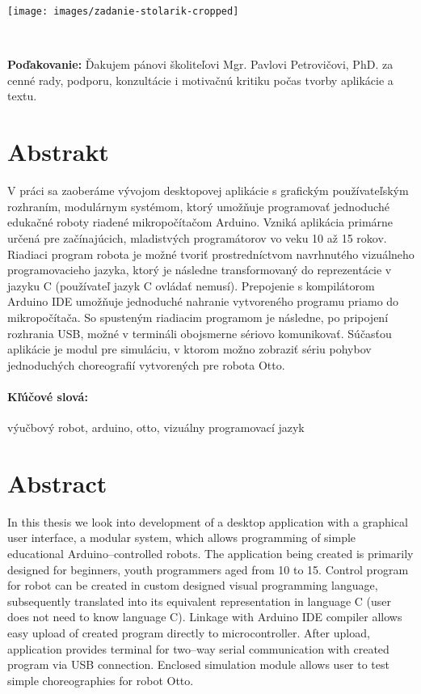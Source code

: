\documentclass[12pt, twoside]{book}
\begin{document}
\newpage 
\thispagestyle{empty}
\hspace{-2cm}\texttt{[image: images/zadanie-stolarik-cropped]}


\frontmatter

\setcounter{page}{3}
\newpage 
~

\vfill
{\bf Poďakovanie:} Ďakujem pánovi školiteľovi Mgr. Pavlovi Petrovičovi, PhD. za cenné rady, podporu, konzultácie i motivačnú kritiku počas tvorby aplikácie a textu.


\newpage 
\section*{Abstrakt}
V práci sa zaoberáme vývojom desktopovej aplikácie s grafickým používateľským rozhraním, modulárnym systémom, ktorý umožňuje programovať jednoduché edukačné roboty riadené mikropočítačom Arduino. Vzniká aplikácia primárne určená pre začínajúcich, mladistvých programátorov vo veku 10 až 15 rokov. Riadiaci program robota je možné tvoriť prostredníctvom navrhnutého vizuálneho programovacieho jazyka, ktorý je následne transformovaný do reprezentácie v jazyku C (používateľ jazyk C ovládať nemusí). Prepojenie s kompilátorom Arduino IDE umožňuje jednoduché nahranie vytvoreného programu priamo do mikropočítača. So spusteným riadiacim programom je následne, po pripojení rozhrania USB, možné v termináli obojsmerne sériovo komunikovať. Súčasťou aplikácie je modul pre simuláciu, v ktorom možno zobraziť sériu pohybov jednoduchých choreografií vytvorených pre robota Otto.

\paragraph*{Kľúčové slová:} výučbový robot, arduino, otto, vizuálny programovací jazyk


\newpage 
\section*{Abstract}

In this thesis we look into development of a desktop application with a graphical user interface, a modular system, which allows programming of simple educational Arduino--controlled robots. The application being created is primarily designed for beginners, youth programmers aged from 10 to 15. Control program for robot can be created in custom designed visual programming language, subsequently translated into its equivalent representation in language C (user does not need to know language C). Linkage with Arduino IDE compiler allows easy upload of created program directly to microcontroller. After upload, application provides terminal for two--way serial communication with created program via USB connection. Enclosed simulation module allows user to test simple choreographies for robot Otto.
\end{document}
